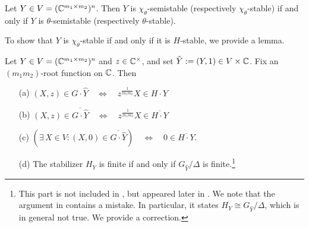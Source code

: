 \begin{prop} \label{prop:KingProposition-3-1}
	Let $Y \in V = (\mathbb C^{m_1 \times m_2})^n$. Then $Y$ is $\chi_{\theta}$-semistable (respectively $\chi_{\theta}$-stable) if and only if $Y$ is $\theta$-semistable (respectively $\theta$-stable). 
\end{prop}

To show that $Y$ is $\chi_\theta$-stable if and only if it is $H$-stable, we provide a lemma. 

\begin{lemma}
	\label{lem:RelationToKing}
	Let $Y \in V = (\mathbb C^{m_1 \times m_2})^n$ and $z \in \mathbb C^\times$, and set $\hat{Y} := (Y,1) \in V \times \mathbb C$. Fix an $(m_1 m_2)$-root function on $\mathbb C$. Then
	\begin{itemize}\itemsep 3pt
		\item[(a)] $(X,z) \in G \cdot \hat{Y} \quad \Leftrightarrow \quad z^{\frac{1}{m_1 m_2}} X \in H \cdot Y$
		\item[(b)] $(X,z) \in \overline{G \cdot \hat{Y}} \quad \Leftrightarrow \quad z^{\frac{1}{m_1 m_2}} X \in \overline{H \cdot Y}$
		\item[(c)] $\left( \exists \, X \in V  \colon (X,0) \in \overline{G \cdot \hat{Y}} \right) \quad \Leftrightarrow \quad 0 \in \overline{H \cdot Y}$. 
		\item[(d)] The stabilizer $H_Y$ is finite if and only if $G_{\hat{Y}} / \Delta$ is finite.\footnote{This part is not included in \cite[Lemma~A.1]{SiagaPaper}, but appeared later in \cite[Appendix~A]{SiagaPaper}. We note that the argument in \cite{SiagaPaper} contains a mistake. In particular, it states $H_Y \cong G_{\hat{Y}} / \Delta$, which is in general not true. We provide a correction.}
	\end{itemize}
\end{lemma}

